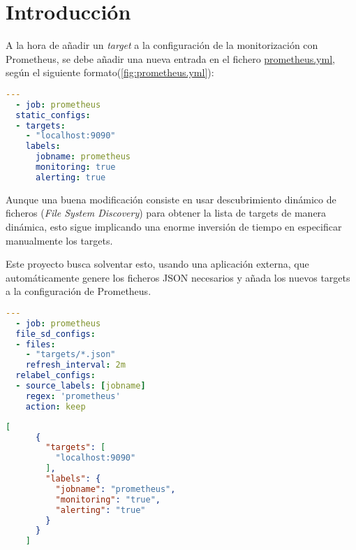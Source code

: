 \chapter{Introducción}
\label{ch:intro}
A la hora de añadir un \textit{target} a la configuración de la monitorización con Prometheus, se debe añadir una nueva entrada en el fichero \url{prometheus.yml}, según el siguiente formato(\ref{fig:prometheus.yml}):

\begin{lstlisting}[language=Yaml,frame=single,caption={Configuración estática de prometheus.yml:},label={fig:prometheus.yml}]
  ---
  - job: prometheus
  static_configs:
  - targets:
    - "localhost:9090"
    labels:
      jobname: prometheus
      monitoring: true
      alerting: true
  \end{lstlisting}

Aunque una buena modificación consiste en usar descubrimiento dinámico de ficheros (\textit{File System Discovery}) para obtener la lista de targets de manera dinámica, esto sigue implicando una enorme inversión de tiempo en especificar manualmente los targets.

Este proyecto busca solventar esto, usando una aplicación externa, que automáticamente genere los ficheros JSON necesarios y añada los nuevos targets a la configuración de Prometheus.
\begin{lstlisting}[language=yaml,frame=single,caption={Usando file\_sd\_configs:}]
  ---
  - job: prometheus
  file_sd_configs:
  - files:
    - "targets/*.json"
    refresh_interval: 2m
  relabel_configs:
  - source_labels: [jobname]
    regex: 'prometheus'
    action: keep
  \end{lstlisting}
  \begin{lstlisting}[language=json,frame=single,caption={Especificación de targets en JSON:}]
    [
      {
        "targets": [
          "localhost:9090"
        ],
        "labels": {
          "jobname": "prometheus",
          "monitoring": "true",
          "alerting": "true"
        }
      }
    ]
    \end{lstlisting}
